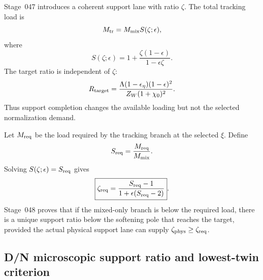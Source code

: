 Stage~047 introduces a coherent support lane with ratio \(\zeta\).  The total tracking load is
\begin{equation}
\label{eq:part03-Mtr-support-factor}
M_{\rm tr}=M_{\rm mix}S(\zeta;\epsilon),
\end{equation}
where
\begin{equation}
\label{eq:part03-S-zeta}
\boxed{
S(\zeta;\epsilon)=1+\frac{\zeta(1-\epsilon)}{1-\epsilon\zeta}}.
\end{equation}
The target ratio is independent of \(\zeta\):
\begin{equation}
\label{eq:part03-Rtarget-coherent}
R_{\rm target}=\frac{\Lambda(1-\epsilon_\eta)(1-\epsilon)^2}{Z_W(1+\chi_0)^2}.
\end{equation}
Thus support completion changes the available loading but not the selected normalization demand.

Let \(M_{\rm req}\) be the load required by the tracking branch at the selected \(\xi\).  Define
\begin{equation}
\label{eq:part03-Sreq}
S_{\rm req}=\frac{M_{\rm req}}{M_{\rm mix}}.
\end{equation}
Solving \(S(\zeta;\epsilon)=S_{\rm req}\) gives
\begin{equation}
\label{eq:part03-zeta-req}
\boxed{
\zeta_{\rm req}=\frac{S_{\rm req}-1}{1+
\epsilon(S_{\rm req}-2)}}.
\end{equation}
Stage~048 proves that if the mixed-only branch is below the required load, there is a unique support ratio below the softening pole that reaches the target, provided the actual physical support lane can supply \(\zeta_{\rm phys}\geq\zeta_{\rm req}\).

\subsection{D/N microscopic support ratio and lowest-twin criterion}
\label{subsec:part03-DN-zeta}

